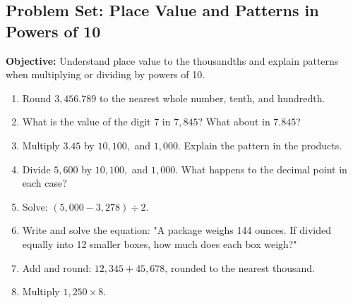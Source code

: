 \documentclass[12pt]{article}
\title{}
\date{}
\begin{document}
\subsection*{Problem Set: Place Value and Patterns in Powers of 10}
\onehalfspacing

\begin{tcolorbox}[colframe=black!40, colback=gray!5, 
coltitle=black, colbacktitle=black!20, fonttitle=\bfseries\Large, 
title=Learning Objective, halign title=center, left=5pt, right=5pt, top=5pt, bottom=15pt]
\textbf{Objective:} Understand place value to the thousandths and explain patterns when multiplying or dividing by powers of 10.
\end{tcolorbox}

\begin{tcolorbox}[colframe=black!60, colback=white, 
coltitle=black, colbacktitle=black!15, fonttitle=\bfseries\Large, 
title=Exercises, halign title=center, left=10pt, right=10pt, top=10pt, bottom=30pt]
\begin{enumerate}[itemsep=3em]
    \item Round \( 3,456.789 \) to the nearest whole number, tenth, and hundredth.
    \item What is the value of the digit \( 7 \) in \( 7,845 \)? What about in \( 7.845 \)?
    \item Multiply \( 3.45 \) by \( 10, 100, \) and \( 1,000 \). Explain the pattern in the products.
    \item Divide \( 5,600 \) by \( 10, 100, \) and \( 1,000 \). What happens to the decimal point in each case?
    \item Solve: \( (5,000 - 3,278) \div 2 \).
    \item Write and solve the equation: "A package weighs 144 ounces. If divided equally into 12 smaller boxes, how much does each box weigh?"
    \item Add and round: \( 12,345 + 45,678 \), rounded to the nearest thousand.
    \item Multiply \( 1,250 \times 8 \).
    \vspace{1cm}
\end{enumerate}
\end{tcolorbox}

\vspace{1em}
\end{document}
